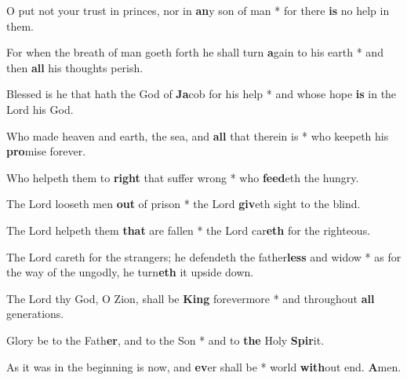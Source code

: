 \begin{multicols}{2}
	O put not your trust in princes, nor in \textbf{an}y son of man * for there \textbf{is} no help in them.
	
	For when the breath of man goeth forth he shall turn \textbf{a}gain to his earth * and then \textbf{all} his thoughts perish.
	
	Blessed is he that hath the God of \textbf{Ja}cob for his help * and whose hope \textbf{is} in the Lord his God.
	
	Who made heaven and earth, the sea, and \textbf{all} that therein is * who keepeth his \textbf{pro}mise forever.
	
	Who helpeth them to \textbf{right} that suffer wrong * who \textbf{feed}eth the hungry.
	
	The Lord looseth men \textbf{out} of prison * the Lord \textbf{giv}eth sight to the blind.
	
	The Lord helpeth them \textbf{that} are fallen * the Lord car\textbf{eth} for the righteous.
	
	The Lord careth for the strangers; he defendeth the father\textbf{less} and widow * as for the way of the ungodly, he turn\textbf{eth} it upside down.
	
	The Lord thy God, O Zion, shall be \textbf{King} forevermore * and throughout \textbf{all} generations.
	
	Glory be to the Fath\textbf{er}, and to the Son * and to \textbf{the} Holy \textbf{Spir}it.
	
	As it was in the beginning is now, and \textbf{ev}er shall be * world \textbf{with}out end. \textbf{A}men.
\end{multicols}